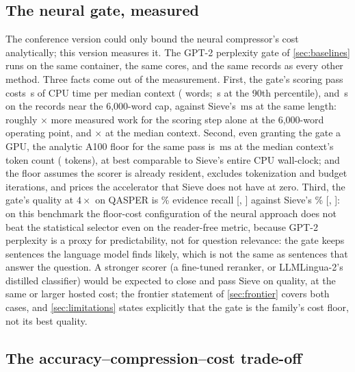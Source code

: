 \documentclass[review,12pt]{elsarticle}
\theoremstyle{remark}
\newcommand{\method}{Sieve}
\newcommand{\ms}{\ensuremath{\mathrm{ms}}}
\begin{document}
\subsection{The neural gate, measured}
\label{sec:gate}
The conference version could only bound the neural compressor's cost
analytically; this version measures it. The GPT-2 perplexity gate of
\autoref{sec:baselines} runs on the same container, the same cores,
and the same records as every other method. Three facts come out of
the measurement. First, the gate's scoring pass costs
\GateLatMedS\,s of CPU time per median context (\GateMedWords{} words;
\GateLatPnineS\,s at the 90th percentile), and \GateLatSixkS\,s on the
\GateSixkN{} records near the 6{,}000-word cap, against \method{}'s
\TimeSieSixk\,\ms{} at the same length: roughly
\GateSieRatioSixk$\times$ more measured work for the scoring step
alone at the 6{,}000-word operating point, and
\GateSieRatioMed$\times$ at the median context. Second, even granting
the gate a GPU, the analytic A100 floor for the same pass is
\GateAOneFloorMs\,\ms{} at the median context's token count
(\GateMedTok{} tokens), at best comparable to \method{}'s entire CPU
wall-clock; and the floor assumes the scorer is already resident,
excludes tokenization and budget iterations, and prices the accelerator
that \method{} does not have at zero. Third, the gate's quality at
$4\times$ on QASPER is \GateRecall\% evidence recall
[\GateRecallLo, \GateRecallHi] against \method{}'s \RecQSie\%
[\RecQSieLo, \RecQSieHi]: on this benchmark the floor-cost
configuration of the neural approach does not beat the statistical
selector even on the reader-free metric, because GPT-2 perplexity is
a proxy for predictability, not for question relevance: the gate keeps
sentences the language model finds likely, which is not the same as
sentences that answer the question. A stronger scorer (a fine-tuned
reranker, or LLMLingua-2's distilled classifier) would be expected to
close and pass \method{} on quality, at the same or larger hosted
cost; the frontier statement of \autoref{sec:frontier} covers both
cases, and \autoref{sec:limitations} states explicitly that the gate
is the family's cost floor, not its best quality.

\subsection{The accuracy--compression--cost trade-off}
\label{sec:threeway}
\end{document}
